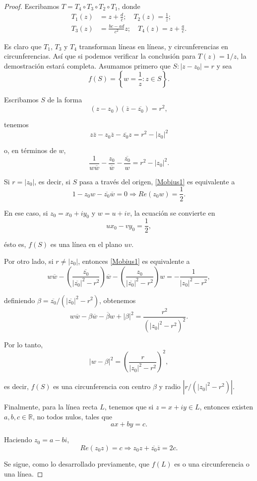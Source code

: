 \begin{proof}
Escribamos $T = T_4 \circ T_3 \circ T_2 \circ T_1$, donde 
\begin{align*}
    T_1(z) &= z + \frac{d}{c}; \quad T_2(z) = \frac{1}{z}; \\
    T_3(z) &= \frac{bc-ad}{c^2}z; \quad T_4(z) = z+ \frac{a}{c}.
\end{align*}

Es claro que $T_1$, $T_3$ y $T_4$ transforman líneas en líneas, y circunferencias en circunferencias. Así que si podemos verificar la conclusión para $T(z) = 1/z$, la demostración estará completa. Asumamos primero que $S: |z-z_0| = r$ y sea
$$f(S) = \left\{ w = \frac{1}{z} : z \in S\right\}.$$

Escribamos $S$ de la forma
$$(z-z_0)(\overline{z} - \overline{z_0}) = r^2,$$

tenemos
$$z \overline{z} - z_0 \overline{z} - \overline{z_0} z = r^2 - |z_0|^2$$

o, en términos de $w$,
\begin{equation}
\frac{1}{w \overline{w}} - \frac{z_0}{\overline{w}} - \frac{\overline{z_0}}{w} = r^2-|z_0|^2.    \label{Mobius1}
\end{equation}

Si $r = |z_0|$, es decir, si $S$ pasa a través del origen, \eqref{Mobius1} es equivalente a 
$$1- z_0 w - \overline{z_0} \overline{w} = 0 \Rightarrow Re(z_0 w) = \frac{1}{2}.$$

En ese caso, si $z_0 = x_0 + iy_0$ y $w = u+iv$, la ecuación se convierte en
$$ux_0 - vy_0 = \frac{1}{2},$$

ésto es, $f(S)$ es una línea en el plano $uv$.

Por otro lado, si $r \neq |z_0|$, entonces \eqref{Mobius1} es equivalente a
$$w \overline{w} - \left( \frac{\overline{z_0}}{|\overline{z_0}|^2 -r^2} \right) \overline{w} - \left( \frac{z_0}{|\overline{z_0}|^2 -r^2} \right) w = - \frac{1}{|z_0|^2 -r^2},$$

definiendo $\beta = \overline{z_0}/(|\overline{z_0}|^2 -r^2)$, obtenemos
$$w \overline{w} - \beta \overline{w} - \overline{\beta} w + |\beta|^2 = \frac{r^2}{(|z_0|^{2} - r^2)^2}.$$

Por lo tanto,
$$|w - \beta|^2 = \left(\frac{r}{|z_0|^{2} - r^2} \right)^2,$$

es decir, $f(S)$ es una circunferencia con centro $\beta$ y radio $|r/(|z_0|^2-r^2)|$.

Finalmente, para la línea recta $L$, tenemos que si $z = x+iy \in L$, entonces existen $a,b,c \in \mathbb{R}$, no todos nulos, tales que
$$ax+by = c.$$

Haciendo $z_0 = a-bi$, 
$$Re(z_0 z) = c \Rightarrow z_0 z + \overline{z_0} \overline{z} = 2c.$$

Se sigue, como lo desarrollado previamente, que $f(L)$ es o una circunferencia o una línea.

 \end{proof}

